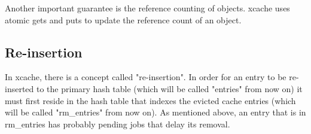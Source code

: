 Another important guarantee is the reference counting of objects. xcache uses 
atomic gets and puts to update the reference count of an object.

\begin{comment}
The refcount model in xcache should be familiar to most people:

\begin{itemize}
	\item When an entry is inserted in cache, the cache holds a reference 
		for it (ref = 1).
	\item Whenever a new lookup for this cache entry succeeds, the reference 
		is increased by 1 (ref++)
	\item When the request that has issued the lookup has finished with an 
		entry, the reference is decreased by 1. (ref--)
	\item When a cache entry is evicted by cache, the its ref is decreased 
		by 1. (ref--)
\end{itemize}

Some common refcount cases are:

\begin{itemize}
	\item active entry with pending jobs (ref > 1)
	\item active entry with no pending jobs (ref = 1)
	\item evicted entry with pending jobs (ref > 0)
	\item evicted entry with no pending jobs (ref = 0)
\end{itemize}

and, as always, the entry is freed only when its ref = 0.

Finally, xcache uses one lock for each hash table but when a cache entry shifts
from one hash table to the other, both locks are acquired.

\end{comment}

\subsection{Re-insertion}

In xcache, there is a concept called "re-insertion". In order for an entry to
be re-inserted to the primary hash table (which will be called "entries" from
now on) it must first reside in the hash table that indexes the evicted cache
entries (which will be called "rm\_entries" from now on). As mentioned above,
an entry that is in rm\_entries has probably pending jobs that delay its
removal.

